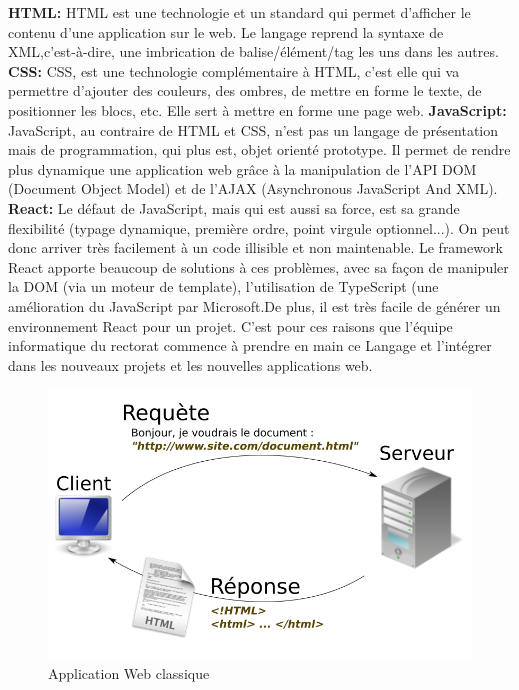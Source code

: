 \documentclass[12pt]{article}
\begin{document}
\textbf{HTML:} HTML est une technologie et un standard qui permet d'afficher le contenu d'une application sur le web. Le langage reprend la syntaxe de XML,c'est-à-dire, une imbrication de balise/élément/tag les uns dans les autres. \newline
\newline
\textbf{CSS:} CSS, est une technologie complémentaire à HTML, c'est elle qui va permettre d'ajouter des couleurs, des ombres, de mettre en forme le texte, de positionner les blocs, etc. Elle sert à mettre en forme une page web. \newline
\newline
\textbf{JavaScript:} JavaScript, au contraire de HTML et CSS, n'est pas un langage de présentation mais de programmation, qui plus est, objet orienté prototype. Il permet de rendre plus dynamique une application web grâce à la manipulation de l'API DOM (Document Object Model) et de l'AJAX (Asynchronous JavaScript And XML).\newline
\newline
\textbf{React:} Le défaut de JavaScript, mais qui est aussi sa force, est sa grande flexibilité (typage dynamique, première ordre, point virgule optionnel...). On peut donc arriver très facilement à un code illisible et non maintenable. Le framework React apporte beaucoup de solutions à ces problèmes, avec sa façon de manipuler la DOM (via un moteur de template), l'utilisation de TypeScript (une amélioration du JavaScript par Microsoft.De plus, il est très facile de générer un environnement React pour un projet. C'est pour ces raisons que l'équipe informatique du rectorat commence à prendre en main ce Langage et l’intégrer dans les nouveaux projets et les nouvelles applications web. 

\begin{figure}[H]
	\centering
 		\includegraphics[width=1\textwidth]{diagrammes/schema-serveur.png} 
  		\caption{Application Web classique}
	\end{figure}
\end{document}
